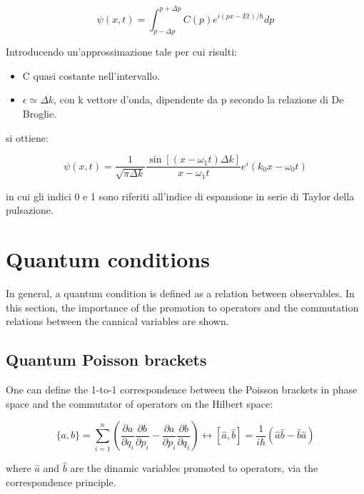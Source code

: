 \documentclass{article}
\begin{document}
\begin{equation}
  \psi(x,t)=\int_{p-\Delta p}^{p+\Delta p} C(p)e^{i(px-Et)/\hbar}dp
\end{equation}

Introducendo un'approssimazione tale per cui risulti:

\begin{itemize}
  \item C quasi costante nell'intervallo.
  \item $\epsilon \simeq \Delta k$, con k vettore d'onda, dipendente da p secondo la relazione di De Broglie.
\end{itemize}

si ottiene:

\begin{equation}
  \psi(x,t)= \frac{1}{\sqrt{\pi \Delta k}}\frac{\sin[(x-\omega_1 t)\Delta k]}{x-\omega_1 t}e^i(k_0x-\omega_0t)
\end{equation}

in cui gli indici 0 e 1 sono riferiti all'indice di espansione in serie di Taylor della pulsazione.

\section{Quantum conditions}

In general, a quantum condition is defined as a relation between observables.
In this section, the importance of the promotion to operators and the commutation relations between the cannical variables are shown.

\subsection{Quantum Poisson brackets}

One can define the 1-to-1 correspondence between the Poisson brackets in phase space and the commutator of operators on the Hilbert space:

\begin{tcolorbox}[colframe=gray!50, colback=gray!10, coltitle=black, title=Quantum Poisson Brackets]

  \begin{equation}
    \{a, b\} = \sum_{i=1}^{n} \left( \frac{\partial a}{\partial q_i} \frac{\partial b}{\partial p_i} - \frac{\partial a}{\partial p_i} \frac{\partial b}{\partial q_i} \right)
    \longleftrightarrow
    [\hat{a}, \hat{b}] = \frac{1}{i\hbar}(\hat{a}\hat{b} - \hat{b}\hat{a})
  \end{equation}

  where $\hat{a}$ and $\hat{b}$ are the dinamic variables promoted to operators, via the correspondence principle.

\end{tcolorbox}
\end{document}
